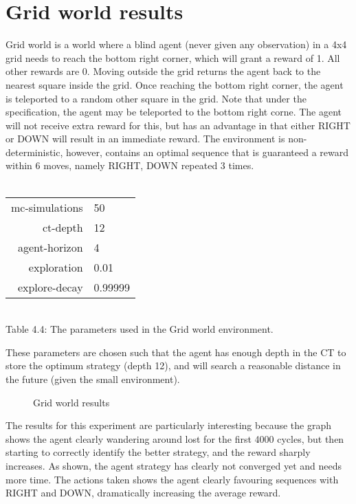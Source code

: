\documentclass[pdftex,twoside,a4paper]{report}
\begin{document}
\section{Grid world results}
Grid world is a world where a blind agent (never given any observation) in a 4x4 grid needs to reach the bottom right corner, which will grant a reward of 1. All other rewards are 0. Moving outside the grid returns the agent back to the nearest square inside the grid. Once reaching the bottom right corner, the agent is teleported to a random other square in the grid. Note that under the specification, the agent may be teleported to the bottom right corne. The agent will not receive extra reward for this, but has an advantage in that either RIGHT or DOWN will result in an immediate reward. The environment is non-deterministic, however, contains an optimal sequence that is guaranteed a reward within 6 moves, namely RIGHT, DOWN repeated 3 times.\\\\
\begin{center}
\begin{tabular}{| r | l | }
\hline
mc-simulations & 50\\
ct-depth & 12\\
agent-horizon & 4\\
exploration & 0.01\\
explore-decay & 0.99999\\
\hline
\end{tabular}\\
\vspace{0.5mm}
Table 4.4: The parameters used in the Grid world environment.
\end{center}
These parameters are chosen such that the agent has enough depth in the CT to store the optimum strategy (depth 12), and will search a reasonable distance in the future (given the small environment).

 \begin{figure}[h]
   \begin{center}
   \end{center}
   \caption{Grid world results}
   \label{fig:grid_results}
 \end{figure}
The results for this experiment are particularly interesting because the graph shows the agent clearly wandering around lost for the first 4000 cycles, but then starting to correctly identify the better strategy, and the reward sharply increases. As shown, the agent strategy has clearly not converged yet and needs more time. The actions taken shows the agent clearly favouring sequences with RIGHT and DOWN, dramatically increasing the average reward.
\end{document}
